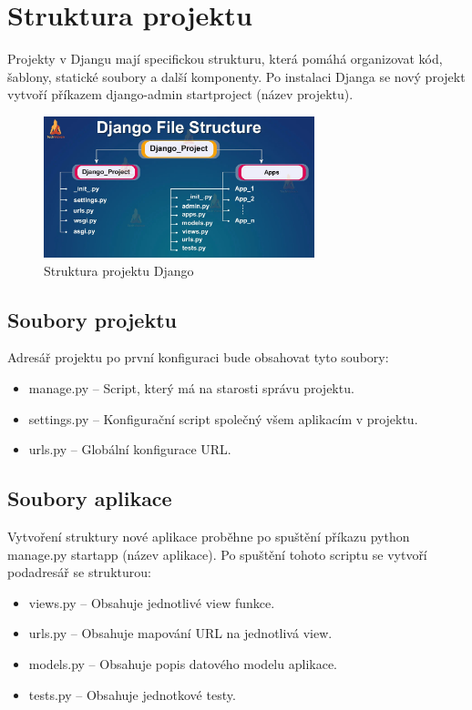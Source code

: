 \documentclass[12pt, a4paper,
twoside,        %
openright
]{report}
\begin{document}
\section{Struktura projektu}
\label{strukturaprojektu}

Projekty v Djangu mají specifickou strukturu, která pomáhá organizovat kód, šablony, statické soubory a další komponenty. Po instalaci Djanga se nový projekt vytvoří příkazem django-admin startproject (název projektu).
	\begin{figure}[h!]
		\centering
		\includegraphics[width=0.7\textwidth]{image/django-struktura.jpg}
		\caption{Struktura projektu Django}
		\label{fig:djangostruktura}
	\end{figure}
\subsection{Soubory projektu}
Adresář projektu po první konfiguraci bude obsahovat tyto soubory:
\begin{itemize}
	\item manage.py – Script, který má na starosti správu projektu.
	\item settings.py – Konfigurační script společný všem aplikacím v projektu.
	\item urls.py – Globální konfigurace URL.
\end{itemize}
\subsection{Soubory aplikace}
Vytvoření struktury nové aplikace proběhne po spuštění příkazu python manage.py startapp (název aplikace). Po spuštění tohoto scriptu se vytvoří podadresář se strukturou:
\begin{itemize}
	\item views.py – Obsahuje jednotlivé view funkce.
	\item urls.py – Obsahuje mapování URL na jednotlivá view.
	\item models.py – Obsahuje popis datového modelu aplikace.
	\item tests.py – Obsahuje jednotkové testy.
\end{itemize}
\end{document}
